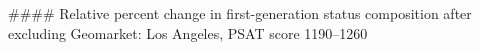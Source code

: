 #### Relative percent change in first-generation status composition after excluding Geomarket: Los Angeles, PSAT score 1190–1260
